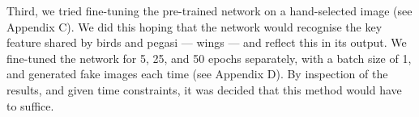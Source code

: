 \documentclass{article}
\begin{document}
Third, we tried fine-tuning the pre-trained network on a hand-selected image (see Appendix C). We did this hoping that the network would recognise the key feature shared by birds and pegasi --- wings --- and reflect this in its output. We fine-tuned the network for 5, 25, and 50 epochs separately, with a batch size of 1, and generated fake images each time (see Appendix D). By inspection of the results, and given time constraints, it was decided that this method would have to suffice.

\printbibliography
\end{document}
